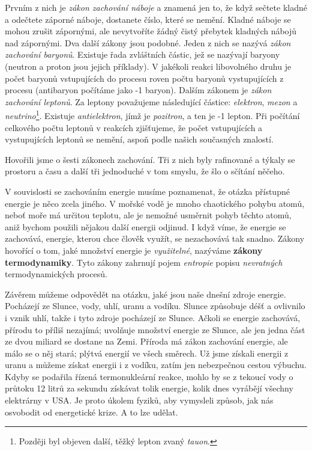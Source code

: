     Prvním z nich je \emph{zákon zachování náboje} a znamená jen to, že když sečtete kladné a 
    odečtete záporné náboje, dostanete číslo, které se nemění. Kladné náboje se mohou zrušit 
    zápornými, ale nevytvoříte žádný čistý přebytek kladných nábojů nad zápornými. Dva další zákony 
    jsou podobné. Jeden z nich se nazývá \emph{zákon zachování baryonů}. Existuje řada zvláštních 
    částic, jež se nazývají baryony (neutron a proton jsou jejich příklady). V jakékoli reakci 
    libovolného druhu je počet baryonů vstupujících do procesu roven počtu baryonů vystupujících z 
    procesu (antibaryon počítáme jako -1 baryon). Dalším zákonem je \emph{zákon zachování leptonů}. 
    Za leptony považujeme následující částice: \emph{elektron}, \emph{mezon} a 
    \emph{neutrino}\footnote{Později byl objeven další, těžký lepton zvaný \emph{tauon}.}. Existuje 
    \emph{antielektron}, jímž je \emph{pozitron}, a ten je -1 lepton. Při počítání celkového počtu 
    leptonů v reakcích zjišťujeme, že počet vstupujících a vystupujících leptonů se nemění, aspoň 
    podle našich současných znalostí.
    
    Hovořili jsme o šesti zákonech zachování. Tři z nich byly rafinované a týkaly se prostoru a 
    času a další tři jednoduché v tom smyslu, že šlo o sčítání něčeho.
    
    V souvislosti se zachováním energie musíme poznamenat, že otázka přístupné energie je něco 
    zcela jiného. V mořské vodě je mnoho chaotického pohybu atomů, neboť moře má určitou teplotu, 
    ale je nemožné usměrnit pohyb těchto atomů, aniž bychom použili nějakou další energii odjinud. 
    I když víme, že energie se zachovává, energie, kterou chce člověk využít, se nezachovává tak 
    snadno. Zákony hovořící o tom, jaké množství energie je \emph{využitelné}, nazýváme 
    \textbf{zákony termodynamiky}. Tyto zákony zahrnují pojem \emph{entropie} popisu 
    \emph{nevratných} termodynamických procesů.
    
    Závěrem můžeme odpovědět na otázku, jaké jsou naše dnešní zdroje energie. Pocházejí ze Slunce, 
    vody, uhlí, uranu a vodíku. Slunce způsobuje déšť a ovlivnilo i vznik uhlí, takže i tyto zdroje 
    pocházejí ze Slunce. Ačkoli se energie zachovává, přírodu to příliš nezajímá; uvolňuje množství 
    energie ze Slunce, ale jen jedna část ze dvou miliard se dostane na Zemi. Příroda má zákon 
    zachování energie, ale málo se o něj stará; plýtvá energií ve všech směrech. Už jsme získali 
    energii z uranu a můžeme získat energii i z vodíku, zatím jen nebezpečnou cestou výbuchu. Kdyby 
    se podařila řízená termonukleární reakce, mohlo by se z tekoucí vody o průtoku \num{12} litrů 
    za sekundu získávat tolik energie, kolik dnes vyrábějí všechny elektrárny v USA. Je proto 
    úkolem fyziků, aby vymysleli způsob, jak nás osvobodit od energetické krize. A to lze udělat.


